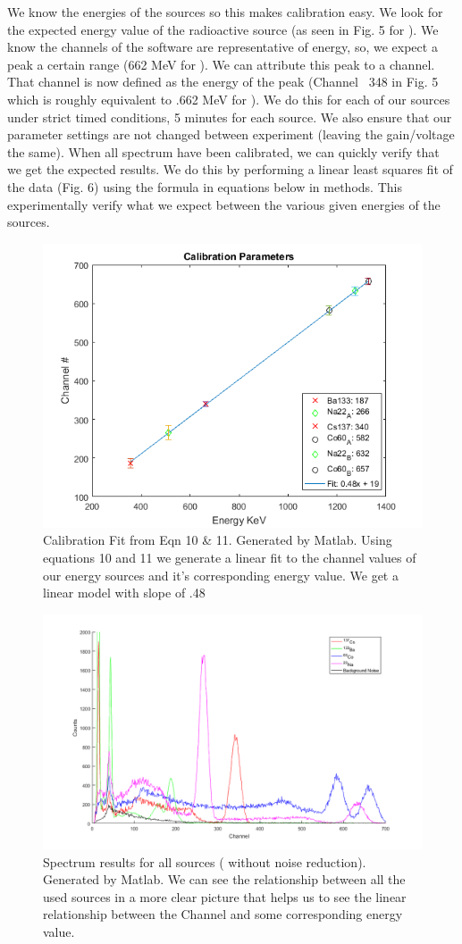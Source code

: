 \documentclass[%
 reprint,
 amsmath,amssymb,
 aps,
]{revtex4-1}
\begin{document}
We know the energies of the sources so this makes calibration easy. We look for the expected energy value of the radioactive source (as seen in Fig. 5 for \cs). We know the channels of the software are representative of energy, so, we expect a peak a certain range (662 MeV for \cs). We can attribute this peak to a channel. That channel is now defined as the energy of the peak (Channel ~348 in Fig. 5 which is roughly equivalent to .662 MeV for \cs). We do this for each of our sources under strict timed conditions, 5 minutes for each source. We also ensure that our parameter settings are not changed between experiment (leaving the gain/voltage the same). When all spectrum have been calibrated, we can quickly verify that we get the expected results. We do this by performing a linear least squares fit of the data (Fig. 6) using the formula in equations below in methods. This experimentally verify what we expect between the various given energies of the sources.

\begin{figure}[ht]
\includegraphics[width = .5\textwidth ,keepaspectratio,frame]{calibration.png}
\caption{ Calibration Fit from Eqn 10 \& 11. Generated by Matlab. Using equations 10 and 11 we generate a linear fit to the channel values of our energy sources and it's corresponding energy value. We get a linear model with slope of .48}
\end{figure}

\begin{figure}[ht!]
\includegraphics[width = .5\textwidth ,keepaspectratio,frame]{all.png}
\caption{  Spectrum results for all sources ( without noise reduction). Generated by Matlab. We can see the relationship between all the used sources in a more clear picture that helps us to see the linear relationship between the Channel and some corresponding energy value.}
\end{figure}
\end{document}
